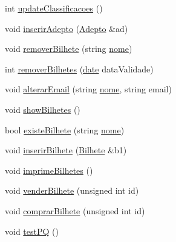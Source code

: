 \begin{DoxyCompactItemize}
\item 
int \hyperlink{class_campeonato_a3344db540ea54bb822a551ab4890d8b3}{update\+Classificacoes} ()
\item 
void \hyperlink{class_campeonato_a1426a2ff63ad60a18ae5bb9e1d5e012c}{inserir\+Adepto} (\hyperlink{class_adepto}{Adepto} \&ad)
\item 
void \hyperlink{class_campeonato_aa6a6700d46b88fabe3a1b0fb34f9a94f}{remover\+Bilhete} (string \hyperlink{class_campeonato_a670b0857b7a8bc3c5dbf0f927ee192fe}{nome})
\item 
int \hyperlink{class_campeonato_ae790ca54160b7aad195cb6ac00911ab8}{remover\+Bilhetes} (\hyperlink{structdate}{date} data\+Validade)
\item 
void \hyperlink{class_campeonato_ac2e4f10063a7eab5db2a2c26c1b775eb}{alterar\+Email} (string \hyperlink{class_campeonato_a670b0857b7a8bc3c5dbf0f927ee192fe}{nome}, string email)
\item 
void \hyperlink{class_campeonato_adeeb564f515b80a5d95c4c4dc969ed91}{show\+Bilhetes} ()
\item 
bool \hyperlink{class_campeonato_a631525832cf345606d7091f1fec762c8}{existe\+Bilhete} (string \hyperlink{class_campeonato_a670b0857b7a8bc3c5dbf0f927ee192fe}{nome})
\item 
void \hyperlink{class_campeonato_a2bff2dfc2a54af52356a6a48bea43d4b}{inserir\+Bilhete} (\hyperlink{class_bilhete}{Bilhete} \&b1)
\item 
void \hyperlink{class_campeonato_a304f842c49f1dc4d6a12c56ef16fc0da}{imprime\+Bilhetes} ()
\item 
void \hyperlink{class_campeonato_aec90a0697ae3f76d05bb0cf938e31f82}{vender\+Bilhete} (unsigned int id)
\item 
void \hyperlink{class_campeonato_a99d8c2f95efb5ac19e3b0d5764bffaa3}{comprar\+Bilhete} (unsigned int id)
\item 
void \hyperlink{class_campeonato_a8db02bd1c7ba93770064d1210a343d72}{test\+P\+Q} ()
\end{DoxyCompactItemize}
